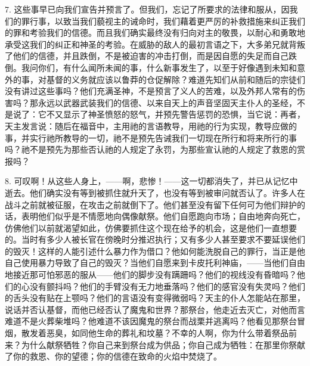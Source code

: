 7. 这些事早已向我们宣告并预言了。但我们，忘记了所要求的法律和服从，因我们的罪行事，以致当我们藐视主的诫命时，我们藉着更严厉的补救措施来纠正我们的罪和考验我们的信德。而且我们确实最终没有归向对主的敬畏，以耐心和勇敢地承受这我们的纠正和神圣的考验。在威胁的敌人的最初言语之下，大多弟兄就背叛了他们的信德，并且跌倒，不是被迫害的冲击打倒，而是因自愿的失足而自己跌倒。我问你们，有什么闻所未闻的事，什么新事发生了，以至于好像遇到未知和意外的事，对基督的义务就应该以鲁莽的仓促解除？难道先知们从前和随后的宗徒们没有讲过这些事吗？他们充满圣神，不是预言了义人的苦难，以及外邦人常有的伤害吗？那永远以武器武装我们的信德、以来自天上的声音坚固天主仆人的圣经，不是说了：它不又显示了神圣愤怒的怒气，并预先警告惩罚的恐惧，当它说：再者，天主发言说：随后在福音中，主用祂的言语教导，用祂的行为实现，教导应做的事，并实行祂所教导的一切，祂不是预先告诫我们一切现在所行和将来所行的事吗？祂不是预先为那些否认祂的人规定了永罚，为那些宣认祂的人规定了救恩的赏报吗？\par

8. 可叹啊！从这些人身上，——啊，悲惨！——这一切都消失了，并已从记忆中逝去。\newline{}他们确实没有等到被抓住就升天了，也没有等到被审问就否认了。\newline{}许多人在战斗之前就被征服，在攻击之前就倒下了。\newline{}他们甚至没有留下任何可为他们辩护的话，表明他们似乎是不情愿地向偶像献祭。\newline{}他们自愿跑向市场；自由地奔向死亡，仿佛他们以前就渴望如此，仿佛要抓住这个现在给予的机会，这是他们一直想要的。\newline{}当时有多少人被长官在傍晚时分推迟执行；又有多少人甚至要求不要延误他们的毁灭！\newline{}这样的人能引述什么暴力作为借口？\newline{}他如何能洗脱自己的罪行，当正是他自己使用暴力导致了自己的毁灭？\newline{}当他们自愿来到卡皮托利神庙，——当他们自由地接近那可怕邪恶的服从——他们的脚步没有蹒跚吗？\newline{}他们的视线没有昏暗吗？他们的心没有颤抖吗？他们的手臂没有无力地垂落吗？\newline{}他们的感官没有失灵吗？他们的舌头没有贴在上颚吗？他们的言语没有变得微弱吗？\newline{}天主的仆人怎能站在那里，说话并否认基督，而他已经否认了魔鬼和世界？\newline{}那祭台，他走近去灭亡，对他而言难道不是火葬柴堆吗？\newline{}他难道不该因魔鬼的祭台而战栗并逃离吗？他看见那祭台冒烟，散发着恶臭，如同他生命的葬礼和坟墓？\newline{}不幸的人啊，你为什么带着祭品前来？\newline{}为什么献祭牺牲？\newline{}你自己来到祭台成为供品；你自己成为牺牲：在那里你祭献了你的救恩、你的望德；你的信德在致命的火焰中焚烧了。\par

